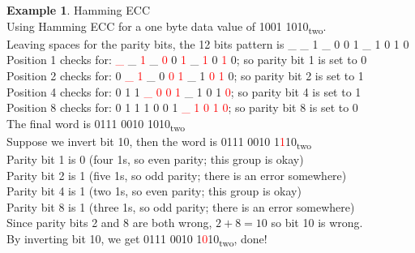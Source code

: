 \documentclass[12pt]{article}
\theoremstyle{definition}
\newtheorem{ex}{Example}[section]
\begin{document}
  \begin{ex} Hamming ECC \\
  Using Hamming ECC for a one byte data value of 1001 1010\textsubscript{two}. \\
  Leaving spaces for the parity bits, the 12 bits pattern is \_ \_ 1 \_ 0 0 1 \_ 1 0 1 0 \\
  Position 1 checks for: \textcolor{red}{\_} \_ \textcolor{red}{1} \_ \textcolor{red}{0} 0 \textcolor{red}{1} \_ \textcolor{red}{1} 0 \textcolor{red}{1} 0; so parity bit 1 is set to 0 \\
  Position 2 checks for: 0 \textcolor{red}{\_} \textcolor{red}{1} \_ 0 \textcolor{red}{0} \textcolor{red}{1} \_ 1 \textcolor{red}{0} \textcolor{red}{1} 0;  so parity bit 2 is set to 1 \\
  Position 4 checks for: 0 1 1 \textcolor{red}{\_} \textcolor{red}{0} \textcolor{red}{0} \textcolor{red}{1} \_ 1 0 1 \textcolor{red}{0}; so parity bit 4 is set to 1 \\
  Position 8 checks for: 0 1 1 1 0 0 1 \textcolor{red}{\_} \textcolor{red}{1} \textcolor{red}{0} \textcolor{red}{1} \textcolor{red}{0}; so parity bit 8 is set to 0 \\

  The final word is 0111 0010 1010\textsubscript{two} \\
  Suppose we invert bit 10, then the word is 0111 0010 1\textcolor{red}{1}10\textsubscript{two} \\
  Parity bit 1 is 0 (four 1s, so even parity; this group is okay) \\
  Parity bit 2 is 1 (five 1s, so odd parity; there is an error somewhere) \\
  Parity bit 4 is 1 (two 1s, so even parity; this group is okay) \\
  Parity bit 8 is 1 (three 1s, so odd parity; there is an error somewhere) \\
  Since parity bits 2 and 8 are both wrong, $2 + 8 = 10$ so bit 10 is wrong. \\
  By inverting bit 10, we get 0111 0010 1\textcolor{red}{0}10\textsubscript{two}, done!
  \end{ex}
\end{document}
